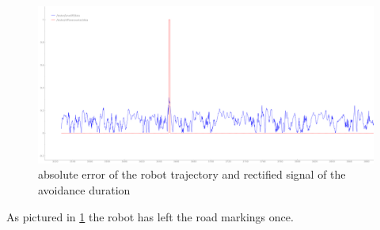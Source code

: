 \begin{figure}[H]
	\includegraphics[width=\textwidth]{Pictures/final analysis no obstacle}
	\caption{absolute error of the robot trajectory and rectified signal of the avoidance duration}
	\label{noobserr}
\end{figure}

As pictured in \ref{noobserr} the robot has left the road markings once.\\

